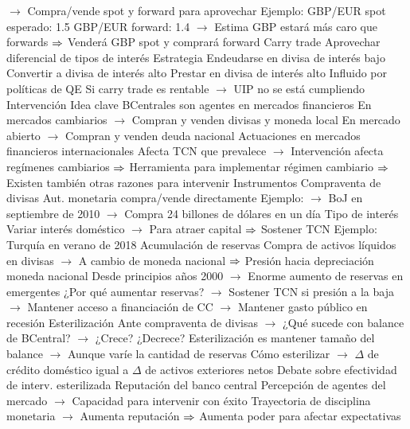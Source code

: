\documentclass{nuevotema}
\begin{document}
\begin{esquemal}
				\4[] $\to$ Compra/vende spot y forward para aprovechar
				\4 Ejemplo:
				\4[] GBP/EUR spot esperado: 1.5
				\4[] GBP/EUR forward: 1.4
				\4[] $\to$ Estima GBP estará más caro que forwards
				\4[] $\Rightarrow$ Venderá GBP spot y comprará forward
			\3 Carry trade
				\4 Aprovechar diferencial de tipos de interés
				\4 Estrategia
				\4[] Endeudarse en divisa de interés bajo
				\4[] Convertir a divisa de interés alto
				\4[] Prestar en divisa de interés alto
				\4 Influido por políticas de QE
				\4 Si carry trade es rentable
				\4[] $\to$ UIP no se está cumpliendo
		\2 Intervención
			\3 Idea clave
				\4 BCentrales son agentes en mercados financieros
				\4[] En mercados cambiarios
				\4[] $\to$ Compran y venden divisas y moneda local
				\4[] En mercado abierto
				\4[] $\to$ Compran y venden deuda nacional
				\4 Actuaciones en mercados financieros internacionales
				\4[] Afecta TCN que prevalece
				\4[] $\to$ Intervención afecta regímenes cambiarios
				\4[] $\Rightarrow$ Herramienta para implementar régimen cambiario
				\4[] $\Rightarrow$ Existen también otras razones para intervenir
			\3 Instrumentos
				\4 Compraventa de divisas
				\4[] Aut. monetaria compra/vende directamente
				\4[] Ejemplo:
				\4[] $\to$ BoJ en septiembre de 2010
				\4[] $\to$ Compra 24 billones de dólares en un día
				\4 Tipo de interés
				\4[] Variar interés doméstico
				\4[] $\to$ Para atraer capital
				\4[] $\Rightarrow$ Sostener TCN
				\4[] Ejemplo: Turquía en verano de 2018
				\4 Acumulación de reservas
				\4[] Compra de activos líquidos en divisas
				\4[] $\to$ A cambio de moneda nacional
				\4[] $\Rightarrow$ Presión hacia depreciación moneda nacional
				\4[] Desde principios años 2000
				\4[] $\to$ Enorme aumento de reservas en emergentes
				\4[] ¿Por qué aumentar reservas?
				\4[] $\to$ Sostener TCN si presión a la baja
				\4[] $\to$ Mantener acceso a financiación de CC
				\4[] $\to$ Mantener gasto público en recesión
				\4 Esterilización
				\4[] Ante compraventa de divisas
				\4[] $\to$ ¿Qué sucede con balance de BCentral?
				\4[] $\to$ ¿Crece? ¿Decrece?
				\4[] Esterilización es mantener tamaño del balance
				\4[] $\to$ Aunque varíe la cantidad de reservas
				\4[] Cómo esterilizar
				\4[] $\to$ $\Delta$ de crédito doméstico igual a $\Delta$ de activos exteriores netos
				\4[] Debate sobre efectividad de interv. esterilizada
				\4 Reputación del banco central
				\4[] Percepción de agentes del mercado
				\4[] $\to$ Capacidad para intervenir con éxito
				\4[] Trayectoria de disciplina monetaria
				\4[] $\to$ Aumenta reputación
				\4[] $\Rightarrow$ Aumenta poder para afectar expectativas

\end{esquemal}
\end{document}
